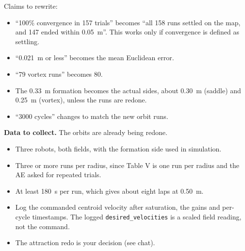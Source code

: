 \documentclass[10pt]{article}
\begin{document}
\medskip
Claims to rewrite:
\begin{itemize}
\item ``100\% convergence in 157 trials'' becomes ``all 158 runs settled on the map, and 147 ended within 0.05~m''. This works only if convergence is defined as settling.
\item ``0.021~m or less'' becomes the mean Euclidean error.
\item ``79 vortex runs'' becomes 80.
\item The 0.33~m formation becomes the actual sides, about 0.30~m (saddle) and 0.25~m (vortex), unless the runs are redone.
\item ``3000 cycles'' changes to match the new orbit runs.
\end{itemize}

\textbf{Data to collect.} The orbits are already being redone.
\begin{itemize}
\item Three robots, both fields, with the formation side used in simulation.
\item Three or more runs per radius, since Table V is one run per radius and the AE asked for repeated trials.
\item At least 180~s per run, which gives about eight laps at 0.50~m.
\item Log the commanded centroid velocity after saturation, the gains and per-cycle timestamps. The logged \texttt{desired\_velocities} is a scaled field reading, not the command.
\item The attraction redo is your decision (see chat).
\end{itemize}
\end{document}
